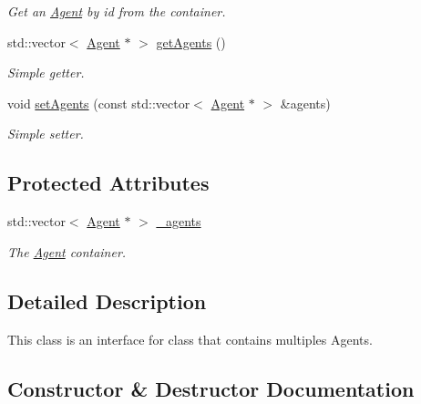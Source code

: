 \begin{DoxyCompactItemize}
\begin{DoxyCompactList}\small\item\em Get an \hyperlink{classAgent}{Agent} by id from the container. \end{DoxyCompactList}\item 
std\+::vector$<$ \hyperlink{classAgent}{Agent} $\ast$ $>$ \hyperlink{classAgentContainer_a9b6f87fa0c8b3ca9d49e2cff3d1c1343}{get\+Agents} ()
\begin{DoxyCompactList}\small\item\em Simple getter. \end{DoxyCompactList}\item 
void \hyperlink{classAgentContainer_a3e7b68a0539a9f4f9ba067943adfd7c1}{set\+Agents} (const std\+::vector$<$ \hyperlink{classAgent}{Agent} $\ast$ $>$ \&agents)
\begin{DoxyCompactList}\small\item\em Simple setter. \end{DoxyCompactList}\end{DoxyCompactItemize}
\subsection*{Protected Attributes}
\begin{DoxyCompactItemize}
\item 
std\+::vector$<$ \hyperlink{classAgent}{Agent} $\ast$ $>$ \hyperlink{classAgentContainer_adbcf662c5eb935864cfa02dc617e867c}{\+\_\+agents}\hypertarget{classAgentContainer_adbcf662c5eb935864cfa02dc617e867c}{}\label{classAgentContainer_adbcf662c5eb935864cfa02dc617e867c}

\begin{DoxyCompactList}\small\item\em The \hyperlink{classAgent}{Agent} container. \end{DoxyCompactList}\end{DoxyCompactItemize}


\subsection{Detailed Description}
This class is an interface for class that contains multiples Agents. 

\subsection{Constructor \& Destructor Documentation}
